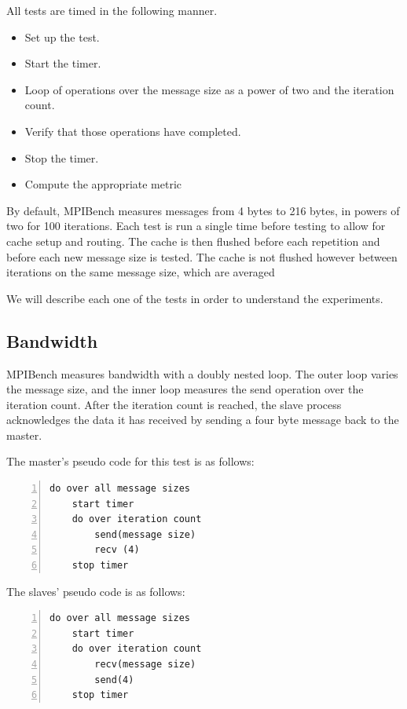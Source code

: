 All tests are timed in the following manner.

\begin{itemize}
    \item Set up the test.
    \item Start the timer.
    \item Loop of operations over the message size as a power of two and the
iteration count.
    \item Verify that those operations have completed.
    \item Stop the timer.
    \item Compute the appropriate metric
\end{itemize}

By default, MPIBench measures messages from 4 bytes to 216 bytes, in powers of
two for 100 iterations. Each test is run a single time before testing to allow
for cache setup and routing. The cache is then flushed before each repetition
and before each new message size is tested. The cache is not flushed however
between iterations on the same message size, which are averaged

We will describe each one of the tests in order to understand the experiments.


\subsection{Bandwidth}

MPIBench measures bandwidth with a doubly nested loop. The outer loop varies the
message size, and the inner loop measures the send operation over the
iteration count. After the iteration count is reached, the slave process
acknowledges the data it has received by sending a four byte message back to
the master. 

The master's pseudo code for this test is as follows:

\begin{lstlisting}[frame=single,numbers=left]
do over all message sizes 
    start timer
    do over iteration count 
        send(message size) 
        recv (4)
    stop timer
\end{lstlisting}

The slaves' pseudo code is as follows:

\begin{lstlisting}[frame=single,numbers=left]
do over all message sizes 
    start timer
    do over iteration count 
        recv(message size) 
        send(4)
    stop timer
\end{lstlisting}


